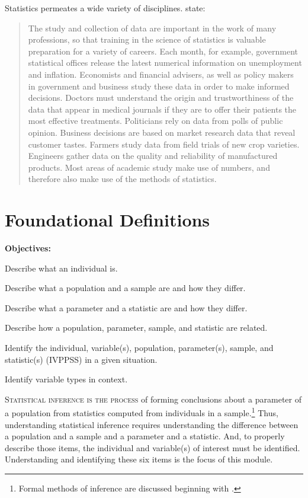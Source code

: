 \documentclass[10pt,openany]{book}\usepackage[]{graphicx}\usepackage[]{color}
\begin{document}
Statistics permeates a wide variety of disciplines. \cite{MooreMcCabe1998} state:
\begin{quote}
The study and collection of data are important in the work of many professions, so that training in the science of statistics is valuable preparation for a variety of careers. Each month, for example, government statistical offices release the latest numerical information on unemployment and inflation. Economists and financial advisers, as well as policy makers in government and business study these data in order to make informed decisions. Doctors must understand the origin and trustworthiness of the data that appear in medical journals if they are to offer their patients the most effective treatments. Politicians rely on data from polls of public opinion. Business decisions are based on market research data that reveal customer tastes. Farmers study data from field trials of new crop varieties. Engineers gather data on the quality and reliability of manufactured products. Most areas of academic study make use of numbers, and therefore also make use of the methods of statistics.
\end{quote}



\chapter{Foundational Definitions} \label{chap:FoundationalDefinitions}
\begin{ChapObj}{\boxwidth}
  \textbf{Objectives:}
  \begin{Enumerate}
    \item Describe what an individual is.
    \item Describe what a population and a sample are and how they differ.
    \item Describe what a parameter and a statistic are and how they differ.
    \item Describe how a population, parameter, sample, and statistic are related.
    \item Identify the individual, variable(s), population, parameter(s), sample, and statistic(s) (IVPPSS) in a given situation.
    \item Identify variable types in context.
  \end{Enumerate}
\end{ChapObj}

\minitoc
\newpage

\lettrine{S}{tatistical inference is the process} of forming conclusions about a parameter of a population from statistics computed from individuals in a sample.\footnote{Formal methods of inference are discussed beginning with .} Thus, understanding statistical inference requires understanding the difference between a population and a sample and a parameter and a statistic. And, to properly describe those items, the individual and variable(s) of interest must be identified. Understanding and identifying these six items is the focus of this module.
\end{document}
